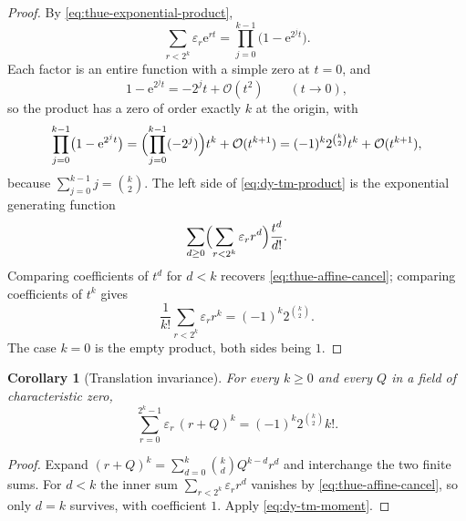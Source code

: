 \documentclass[11pt,oneside]{article}
\newtheorem{corollary}[theorem]{Corollary}
\theoremstyle{definition}
\theoremstyle{remark}
\newcommand{\e}{\mathrm e}
\newcommand{\bigO}{\mathcal O}
\begin{document}
\begin{proof}
By \eqref{eq:thue-exponential-product},
\begin{equation}
 \sum_{r<2^k}\varepsilon_r\e^{rt}=\prod_{j=0}^{k-1}\bigl(1-\e^{2^jt}\bigr).
                                                               \label{eq:dy-tm-product}
\end{equation}
Each factor is an entire function with a simple zero at $t=0$, and
\begin{equation*}
 1-\e^{2^jt}=-2^jt+\bigO(t^2)\qquad(t\to0),
\end{equation*}
so the product has a zero of order exactly $k$ at the origin, with
\begin{equation*}
 \prod_{j=0}^{k-1}\bigl(1-\e^{2^jt}\bigr)
 =\Bigl(\prod_{j=0}^{k-1}(-2^j)\Bigr)t^k+\bigO(t^{k+1})
 =(-1)^k2^{\binom k2}t^k+\bigO(t^{k+1}),
\end{equation*}
because $\sum_{j=0}^{k-1}j=\binom k2$.  The left side of \eqref{eq:dy-tm-product} is the
exponential generating function
\begin{equation*}
 \sum_{d\ge0}\Bigl(\sum_{r<2^k}\varepsilon_r r^d\Bigr)\frac{t^d}{d!}.
\end{equation*}
Comparing coefficients of $t^d$ for $d<k$ recovers \eqref{eq:thue-affine-cancel}; comparing
coefficients of $t^k$ gives
\begin{equation*}
 \frac1{k!}\sum_{r<2^k}\varepsilon_r r^k=(-1)^k2^{\binom k2}.
\end{equation*}
The case $k=0$ is the empty product, both sides being $1$.
\end{proof}

\begin{corollary}[Translation invariance]
\label{cor:dy-tm-moment-shift}
For every $k\ge0$ and every $Q$ in a field of characteristic zero,
\begin{equation}
 \sum_{r=0}^{2^k-1}\varepsilon_r\,(r+Q)^k=(-1)^k2^{\binom k2}k!.
                                                               \label{eq:dy-tm-moment-shift}
\end{equation}
\end{corollary}

\begin{proof}
Expand $(r+Q)^k=\sum_{d=0}^{k}\binom kdQ^{k-d}r^d$ and interchange the two finite sums.  For
$d<k$ the inner sum $\sum_{r<2^k}\varepsilon_rr^d$ vanishes by \eqref{eq:thue-affine-cancel},
so only $d=k$ survives, with coefficient $1$.  Apply \eqref{eq:dy-tm-moment}.
\end{proof}
\end{document}

